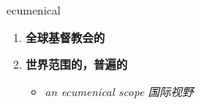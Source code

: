 
\begin{frame}
{\huge ecumenical}
\begin{center}
\begin{enumerate}\Large
  \item \textbf{全球基督教会的}
  \item \textbf{世界范围的，普遍的}
  \begin{itemize}
    \item \em{\Large{an ecumenical scope 国际视野}}
  \end{itemize}
\end{enumerate}
\end{center}
\end{frame}

